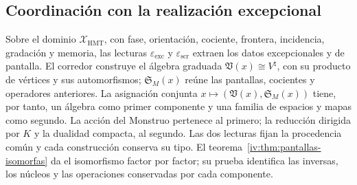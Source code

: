\subsection{Coordinación con la realización excepcional}

Sobre el dominio \(\mathcal X_{\mathrm{HMT}}\), con fase, orientación,
cociente, frontera, incidencia, gradación y memoria, las lecturas
\(\varepsilon_{\mathrm{exc}}\) y \(\varepsilon_{\mathrm{scr}}\) extraen
los datos excepcionales y de pantalla. El corredor construye el álgebra
graduada \(\mathfrak V(x)\cong V^\natural\), con su producto de vértices
y sus automorfismos; \(\mathfrak S_M(x)\) reúne las pantallas, cocientes
y operadores anteriores. La asignación conjunta
\(x\mapsto(\mathfrak V(x),\mathfrak S_M(x))\) tiene, por tanto, un
álgebra como primer componente y una familia de espacios y mapas como segundo.
La acción del Monstruo pertenece al primero; la reducción dirigida por \(K\)
y la dualidad compacta, al segundo. Las dos lecturas fijan la procedencia
común y cada construcción conserva su tipo.
El teorema~\ref{iv:thm:pantallas-isomorfas} da el isomorfismo
factor por factor; su prueba identifica las inversas, los núcleos
y las operaciones conservadas por cada componente.

